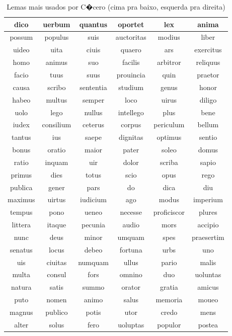 \documentclass[pnumromarab, normaltoc, a4paper, 12pt]{abnt}
\begin{document}
\begin{table}[ht]
\caption{Lemas mais usados por C�cero (cima pra baixo, esquerda pra direita)}
\begin{center}
\begin{tabular}{|c|c|c|c|c|c|}
\hline
dico & uerbum & quantus & oportet & lex & anima \\ \hline
possum & populus & suis & auctoritas & modius & liber \\ \hline
uideo & uita & ciuis & quaero & ars & exercitus \\ \hline
homo & animus & suo & facilis & arbitror & reliquus \\ \hline
facio & tuus & suus & prouincia & quin & praetor \\ \hline
causa & scribo & sententia & studium & genus & honor \\ \hline
habeo & multus & semper & loco & uirus & diligo \\ \hline
uolo & lego & nullus & intellego & plus & bene \\ \hline
iudex & consilium & ceterus & corpus & periculum & bellum \\ \hline
tantus & ius & saepe & dignitas & optimus & sentio \\ \hline
bonus & oratio & maior & pater & soleo & domus \\ \hline
ratio & inquam & uir & dolor & scriba & sapio \\ \hline
primus & dies & totus & scio & opus & rego \\ \hline
publica & gener & pars & do & dica & diu \\ \hline
maximus & uirtus & iudicium & ago & modus & imperium \\ \hline
tempus & pono & ueneo & necesse & proficiscor & plures \\ \hline
littera & itaque & pecunia & audio & mors & accipio \\ \hline
nunc & deus & minor & umquam & spes & praesertim \\ \hline
senatus & locus & debeo & fortuna & urbs & uno \\ \hline
uis & ciuitas & numquam & ullus & pario & malis \\ \hline
multa & consul & fors & omnino & duo & uoluntas \\ \hline
natura & satis & summo & orator & gratia & amicus \\ \hline
puto & nomen & animo & salus & memoria & moueo \\ \hline
magnus & publico & potis & utor & credo & mens \\ \hline
alter & solus & fero & uoluptas & populor & postea \\ \hline
\end{tabular}
\end{center}
\end{table}

\end{document}
